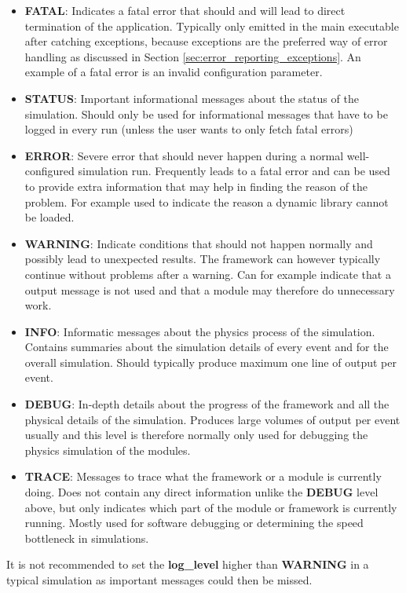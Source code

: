 \begin{itemize}
\item \textbf{FATAL}: Indicates a fatal error that should and will lead to direct termination of the application. Typically only emitted in the main executable after catching exceptions, because exceptions are the preferred way of error handling as discussed in Section \ref{sec:error_reporting_exceptions}. An example of a fatal error is an invalid configuration parameter.
\item \textbf{STATUS}: Important informational messages about the status of the simulation. Should only be used for informational messages that have to be logged in every run (unless the user wants to only fetch fatal errors)
\item \textbf{ERROR}: Severe error that should never happen during a normal well-configured simulation run. Frequently leads to a fatal error and can be used to provide extra information that may help in finding the reason of the problem. For example used to indicate the reason a dynamic library cannot be loaded.
\item \textbf{WARNING}: Indicate conditions that should not happen normally and possibly lead to unexpected results. The framework can however typically continue without problems after a warning. Can for example indicate that a output message is not used and that a module may therefore do unnecessary work.
\item \textbf{INFO}: Informatic messages about the physics process of the simulation. Contains summaries about the simulation details of every event and for the overall simulation. Should typically produce maximum one line of output per event.
\item \textbf{DEBUG}: In-depth details about the progress of the framework and all the physical details of the simulation. Produces large volumes of output per event usually and this level is therefore normally only used for  debugging the physics simulation of the modules.
\item \textbf{TRACE}: Messages to trace what the framework or a module is currently doing. Does not contain any direct information unlike the \textbf{DEBUG} level above, but only indicates which part of the module or framework is currently running. Mostly used for software debugging or determining the speed bottleneck in simulations.
\end{itemize}
It is not recommended to set the \textbf{log\_level} higher than \textbf{WARNING} in a typical simulation as important messages could then be missed.

